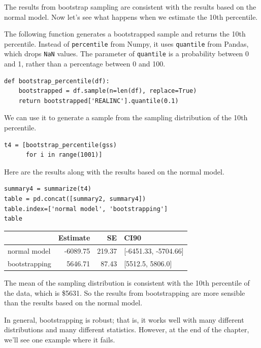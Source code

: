 The results from bootstrap sampling are consistent with the results
based on the normal model. Now let's see what happens when we estimate
the 10th percentile.

The following function generates a bootstrapped sample and returns the
10th percentile. Instead of \passthrough{\lstinline!percentile!} from
Numpy, it uses \passthrough{\lstinline!quantile!} from Pandas, which
drops \passthrough{\lstinline!NaN!} values. The parameter of
\passthrough{\lstinline!quantile!} is a probability between 0 and 1,
rather than a percentage between 0 and 100.

\begin{lstlisting}[]
def bootstrap_percentile(df):
    bootstrapped = df.sample(n=len(df), replace=True)
    return bootstrapped['REALINC'].quantile(0.1)
\end{lstlisting}

We can use it to generate a sample from the sampling distribution of the
10th percentile.

\begin{lstlisting}[]
t4 = [bootstrap_percentile(gss)
      for i in range(1001)]
\end{lstlisting}

Here are the results along with the results based on the normal model.

\begin{lstlisting}[]
summary4 = summarize(t4)
table = pd.concat([summary2, summary4])
table.index=['normal model', 'bootstrapping']
table
\end{lstlisting}

\begin{tabular}{lrrl}
\midrule
{} &  Estimate &      SE &                  CI90 \\
\midrule
normal model  &  -6089.75 &  219.37 &  [-6451.33, -5704.66] \\
bootstrapping &   5646.71 &   87.43 &      [5512.5, 5806.0] \\
\midrule
\end{tabular}

The mean of the sampling distribution is consistent with the 10th
percentile of the data, which is \$5631. So the results from
bootstrapping are more sensible than the results based on the normal
model.

In general, bootstrapping is robust; that is, it works well with many
different distributions and many different statistics. However, at the
end of the chapter, we'll see one example where it fails.

